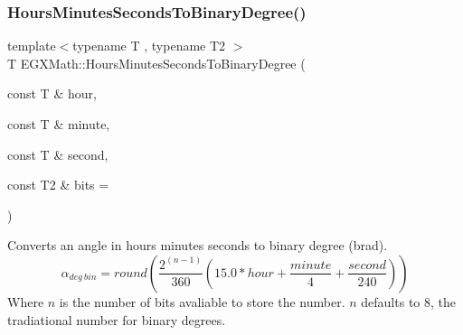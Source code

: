 \mbox{\label{group___e_g_x_math-_angle_conversions-_hours_minutes_seconds_ga962a367fd21f0047eb0a7116a59c2bfc}} 
\subsubsection{\texorpdfstring{Hours\+Minutes\+Seconds\+To\+Binary\+Degree()}{HoursMinutesSecondsToBinaryDegree()}}
{\footnotesize\ttfamily template$<$typename T , typename T2 $>$ \\
T E\+G\+X\+Math\+::\+Hours\+Minutes\+Seconds\+To\+Binary\+Degree (\begin{DoxyParamCaption}\item[{const T \&}]{hour,  }\item[{const T \&}]{minute,  }\item[{const T \&}]{second,  }\item[{const T2 \&}]{bits = {} }\end{DoxyParamCaption})}



Converts an angle in hours minutes seconds to binary degree (brad). \[\alpha_{deg\ bin}=round(\frac{2^{(n-1)}}{360}(15.0 * hour + \frac{minute}{4} + \frac{second}{240}))\] Where $n$ is the number of bits avaliable to store the number. $n$ defaults to 8, the tradiational number for binary degrees. 

